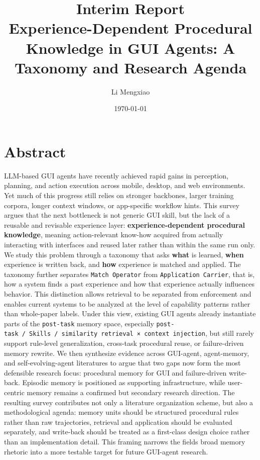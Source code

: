 \documentclass{article}
\title{Interim Report\\[0.4em]\large Experience-Dependent Procedural Knowledge in GUI Agents: A Taxonomy and Research Agenda}
\author{Li Mengxiao}
\date{\today}
\begin{document}
\maketitle
\tableofcontents
\newpage

\section{Abstract}\label{1-abstract}

LLM-based GUI agents have recently achieved rapid gains in perception,
planning, and action execution across mobile, desktop, and web
environments. Yet much of this progress still relies on stronger
backbones, larger training corpora, longer context windows, or
app-specific workflow hints. This survey argues that the next bottleneck
is not generic GUI skill, but the lack of a reusable and revisable
experience layer: \textbf{experience-dependent procedural knowledge},
meaning action-relevant know-how acquired from actually interacting with
interfaces and reused later rather than within the same run only. We
study this problem through a taxonomy that asks \textbf{what} is
learned, \textbf{when} experience is written back, and \textbf{how}
experience is matched and applied. The taxonomy further separates
\texttt{Match\ Operator} from \texttt{Application\ Carrier}, that is,
how a system finds a past experience and how that experience actually
influences behavior. This distinction allows retrieval to be separated
from enforcement and enables current systems to be analyzed at the level
of capability patterns rather than whole-paper labels. Under this view,
existing GUI agents already instantiate parts of the \texttt{post-task}
memory space, especially
\texttt{post-task\ /\ Skills\ /\ similarity\ retrieval\ ×\ context\ injection},
but still rarely support rule-level generalization, cross-task
procedural reuse, or failure-driven memory rewrite. We then synthesize
evidence across GUI-agent, agent-memory, and self-evolving-agent
literatures to argue that two gaps now form the most defensible research
focus: procedural memory for GUI and failure-driven write-back. Episodic
memory is positioned as supporting infrastructure, while user-centric
memory remains a confirmed but secondary research direction. The
resulting survey contributes not only a literature organization scheme,
but also a methodological agenda: memory units should be structured
procedural rules rather than raw trajectories, retrieval and application
should be evaluated separately, and write-back should be treated as a
first-class design choice rather than an implementation detail. This
framing narrows the field\textquotesingle s broad memory rhetoric into a
more testable target for future GUI-agent research.
\end{document}
